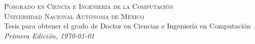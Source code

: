 \vfill
\thispagestyle{empty}

\noindent \textsc{Posgrado en Ciencia e Ingeniería de la Computación\\
Universidad Nacional Autónoma de México}\\

\noindent Tesis para obtener el grado de Doctor en Ciencias e
Ingeniería en Computación\\
\noindent \textit{Primera Edición, \today}
